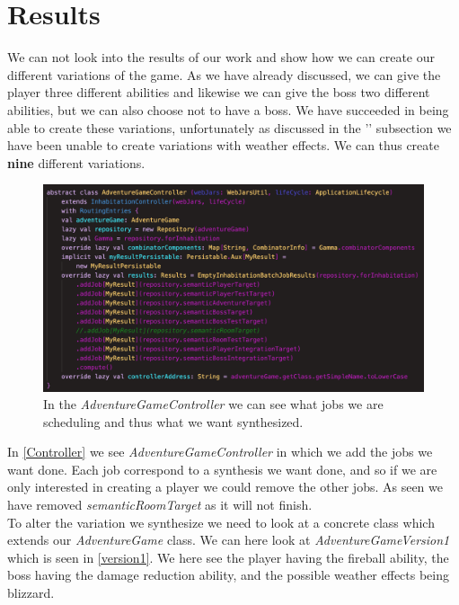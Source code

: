 \section{Results}
We can not look into the results of our work and show how we can create our different variations of the game. As we have already discussed, we can give the player three different abilities and likewise we can give the boss two different abilities, but we can also choose not to have a boss. We have succeeded in being able to create these variations, unfortunately as discussed in the '' subsection we have been unable to create variations with weather effects. We can thus create \textbf{nine} different variations.

\begin{figure}[H]
	\centering
	\includegraphics[width=\linewidth]{Materials/Results/AdventureController}
	\caption{In the \textit{AdventureGameController} we can see what jobs we are scheduling and thus what we want synthesized.}
	\label{Controller}
\end{figure}
In \autoref{Controller} we see \textit{AdventureGameController} in which we add the jobs we want done. Each job correspond to a synthesis we want done, and so if we are only interested in creating a player we could remove the other jobs. As seen we have removed \textit{semanticRoomTarget} as it will not finish.\\
To alter the variation we synthesize we need to look at a concrete class which extends our \textit{AdventureGame} class. We can here look at \textit{AdventureGameVersion1} which is seen in \autoref{version1}. We here see the player having the fireball ability, the boss having the damage reduction ability, and the possible weather effects being blizzard.\\


